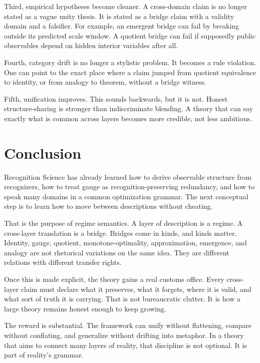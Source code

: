 \documentclass[11pt]{article}
\begin{document}
Third, empirical hypotheses become cleaner. A cross-domain claim is no longer stated as a vague unity thesis. It is stated as a bridge claim with a validity domain and a falsifier. For example, an emergent bridge can fail by breaking outside its predicted scale window. A quotient bridge can fail if supposedly public observables depend on hidden interior variables after all.

Fourth, category drift is no longer a stylistic problem. It becomes a rule violation. One can point to the exact place where a claim jumped from quotient equivalence to identity, or from analogy to theorem, without a bridge witness.

Fifth, unification improves. This sounds backwards, but it is not. Honest structure-sharing is stronger than indiscriminate blending. A theory that can say exactly what is common across layers becomes more credible, not less ambitious.

\section{Conclusion}

Recognition Science has already learned how to derive observable structure from recognizers, how to treat gauge as recognition-preserving redundancy, and how to speak many domains in a common optimization grammar. The next conceptual step is to learn how to move between descriptions without cheating.

That is the purpose of regime semantics. A layer of description is a regime. A cross-layer translation is a bridge. Bridges come in kinds, and kinds matter. Identity, gauge, quotient, monotone-optimality, approximation, emergence, and analogy are not rhetorical variations on the same idea. They are different relations with different transfer rights.

Once this is made explicit, the theory gains a real customs office. Every cross-layer claim must declare what it preserves, what it forgets, where it is valid, and what sort of truth it is carrying. That is not bureaucratic clutter. It is how a large theory remains honest enough to keep growing.

The reward is substantial. The framework can unify without flattening, compare without conflating, and generalize without drifting into metaphor. In a theory that aims to connect many layers of reality, that discipline is not optional. It is part of reality's grammar.
\end{document}
